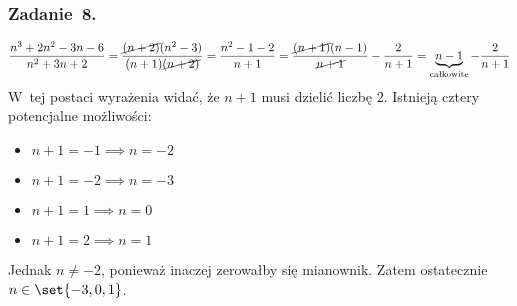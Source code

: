 \subsubsection*{Zadanie~8.}
\begin{equation*}
    \frac{n^3 + 2n^2 - 3n - 6}{n^2 + 3n + 2}
        = \frac{\cancel{(n + 2)}(n^2 - 3)}{(n + 1)\cancel{(n + 2)}}
        = \frac{n^2 - 1 - 2}{n + 1}
        = \frac{\cancel{(n + 1)}(n - 1)}{\cancel{n + 1}} - \frac{2}{n + 1}
        = \underbrace{n - 1}_{\text{całkowite}} - \frac{2}{n + 1}
\end{equation*}
W~tej postaci wyrażenia widać, że \(n + 1\) musi dzielić liczbę \(2\). Istnieją cztery potencjalne możliwości:
\begin{itemize}
    \item \(n + 1 = -1 \implies n = -2\)
    \item \(n + 1 = -2 \implies n = -3\)
    \item \(n + 1 = 1 \implies n = 0\)
    \item \(n + 1 = 2 \implies n = 1\)
\end{itemize}
Jednak \(n \neq -2\), ponieważ inaczej zerowałby się mianownik. Zatem ostatecznie \(n \in \set{-3, 0, 1}\).

